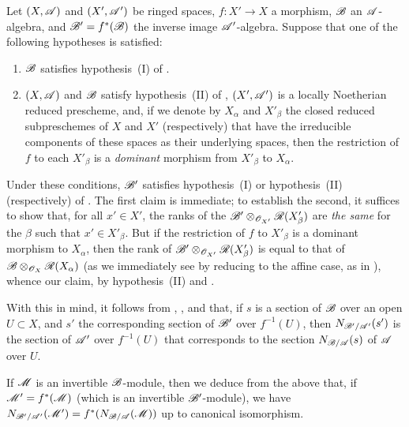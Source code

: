 \begin{env}[6.5.4]
\label{II.6.5.4}
Let $(X,\mathscr{A})$ and $(X',\mathscr{A}')$ be ringed spaces, $f:X'\to X$ a morphism, $\mathscr{B}$ an $\mathscr{A}$-algebra, and $\mathscr{B}'=f^*(\mathscr{B})$ the inverse image $\mathscr{A}'$-algebra.
Suppose that one of the following hypotheses is satisfied:
\begin{enumerate}
  \item $\mathscr{B}$ satisfies hypothesis~(I) of .
  \item $(X,\mathscr{A})$ and $\mathscr{B}$ satisfy hypothesis~(II) of , $(X',\mathscr{A}')$ is a locally Noetherian reduced prescheme, and, if we denote by $X_\alpha$ and $X'_\beta$ the closed reduced subpreschemes of $X$ and $X'$ (respectively) that have the irreducible components of these spaces as their underlying spaces, then the restriction of $f$ to each $X'_\beta$ is a \emph{dominant} morphism from $X'_\beta$ to $X_\alpha$.
\end{enumerate}

Under these conditions, $\mathscr{B}'$ satisfies hypothesis~(I) or hypothesis~(II) (respectively) of .
The first claim is immediate;
to establish the second, it suffices to show that, for all $x'\in X'$, the ranks of the $\mathscr{B}'\otimes_{\mathscr{O}_{X'}}\mathscr{R}(X'_\beta)$ are \emph{the same} for the $\beta$ such that $x'\in X'_\beta$.
But if the restriction of $f$ to $X'_\beta$ is a dominant morphism to $X_\alpha$, then the rank of $\mathscr{B}'\otimes_{\mathscr{O}_{X'}}\mathscr{R}(X'_\beta)$ is equal to that of $\mathscr{B}\otimes_{\mathscr{O}_X}\mathscr{R}(X_\alpha)$ (as we immediately see by reducing to the affine case, as in ), whence our claim, by hypothesis~(II) and .

With this in mind, it follows from , , and  that, if $s$ is a section of $\mathscr{B}$ over an open $U\subset X$, and $s'$ the corresponding section of $\mathscr{B}'$ over $f^{-1}(U)$, then $N_{\mathscr{B}'/\mathscr{A}'}(s')$ is the section of $\mathscr{A}'$ over $f^{-1}(U)$ that corresponds to the section $N_{\mathscr{B}/\mathscr{A}}(s)$ of $\mathscr{A}$ over $U$.

If $\mathscr{M}$ is an invertible $\mathscr{B}$-module, then we deduce from the above that, if $\mathscr{M}'=f^*(\mathscr{M})$ (which is an invertible $\mathscr{B}'$-module), we have $N_{\mathscr{B}'/\mathscr{A}'}(\mathscr{M}')=f^*(N_{\mathscr{B}/\mathscr{A}}(\mathscr{M}))$ up to canonical isomorphism.
\end{env}

